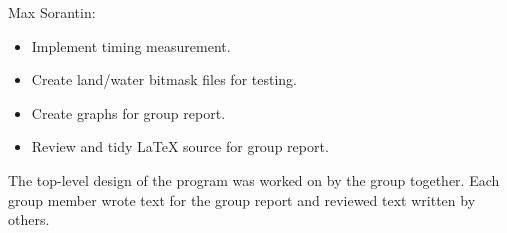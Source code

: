 Max Sorantin:
\begin{itemize}
	\item Implement timing measurement.
	\item Create land/water bitmask files for testing.
	\item Create graphs for group report.
	\item Review and tidy LaTeX source for group report.
\end{itemize}

The top-level design of the program was worked on by the group together.  Each group member wrote text for the group report and reviewed text written by others.

